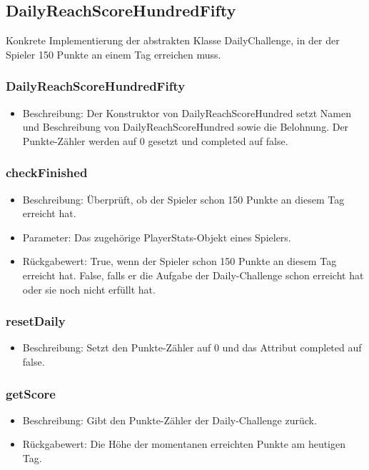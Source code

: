 \documentclass[a4paper]{scrreprt}
\begin{document}
    \subsection{DailyReachScoreHundredFifty}
    Konkrete Implementierung der abstrakten Klasse DailyChallenge, in der der Spieler 150 Punkte an einem Tag erreichen muss.
    \subsubsection{DailyReachScoreHundredFifty}
    \begin{itemize}
        \item Beschreibung: Der Konstruktor von DailyReachScoreHundred setzt Namen und Beschreibung von DailyReachScoreHundred sowie die Belohnung. Der Punkte-Zähler werden auf 0 gesetzt und completed auf false.
    \end{itemize}
    \subsubsection{checkFinished}
    \begin{itemize}
        \item Beschreibung: Überprüft, ob der Spieler schon 150 Punkte an diesem Tag erreicht hat.
        \item Parameter: Das zugehörige PlayerStats-Objekt eines Spielers.
        \item Rückgabewert: True, wenn der Spieler schon 150 Punkte an diesem Tag erreicht hat. False, falls er die Aufgabe der Daily-Challenge schon erreicht hat oder sie noch nicht erfüllt hat.
    \end{itemize}
    \subsubsection{resetDaily}
    \begin{itemize}
        \item Beschreibung: Setzt den Punkte-Zähler auf 0 und das Attribut completed auf false.
    \end{itemize}
    \subsubsection{getScore}
    \begin{itemize}
        \item Beschreibung: Gibt den Punkte-Zähler der Daily-Challenge zurück.
        \item Rückgabewert: Die Höhe der momentanen erreichten Punkte am heutigen Tag.
    \end{itemize}
\end{document}

